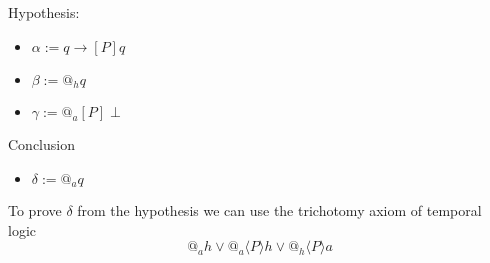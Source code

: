 Hypothesis:

\begin{itemize}
\item $\alpha := q \rightarrow [P]q$

\item $\beta := @_hq$

\item $\gamma := @_a[P]\perp$
\end{itemize}

Conclusion

\begin{itemize}
\item $\delta := @_a q$
\end{itemize}

To prove $\delta$ from the hypothesis we can use the trichotomy axiom of
temporal logic 
$$
@_a h\vee @_a \langle P\rangle h \vee @_h \langle P\rangle a
$$

